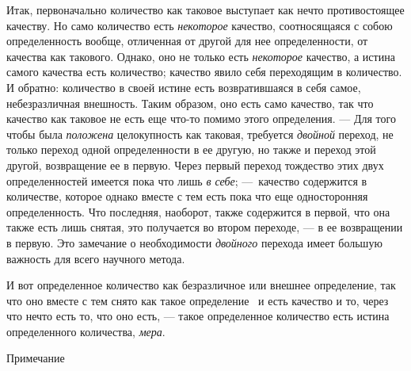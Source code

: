 Итак, первоначально количество как таковое выступает как нечто
противостоящее качеству. Но само количество есть
{\em некоторое} качество, соотносящаяся с собою
определенность вообще, отличенная от другой для нее определенности, от
качества как такового. Однако, оно не только есть
{\em некоторое} качество, а истина самого качества есть
количество; качество явило себя переходящим в количество. И обратно:
количество в своей истине есть возвратившаяся в себя самое, небезразличная
внешность. Таким образом, оно есть само качество, так что качество как
таковое не есть еще что-то помимо этого определения. — Для того чтобы была
{\em положена} целокупность как таковая, требуется
{\em двойной} переход, не только переход одной
определенности в ее другую, но также и переход этой другой, возвращение ее
в первую. Через первый переход тождество этих двух определенностей имеется
пока что лишь {\em в себе}; —~качество содержится в
количестве, которое однако вместе с тем есть пока что еще односторонняя
определенность. Что последняя, наоборот, также содержится в первой, что она
также есть лишь снятая, это получается во втором переходе, — в ее
возвращении в первую. Это замечание о необходимости
{\em двойного} перехода имеет большую важность для
всего научного метода.

И вот определенное количество как безразличное или внешнее определение, так
что оно вместе с тем снято как такое
определение~\label{bkm:Ref474666560}
и есть качество и то, через что нечто есть то, что оно есть, — такое
определенное количество есть истина определенного количества,
{\em мера}.

{\centering
Примечание
\par}

